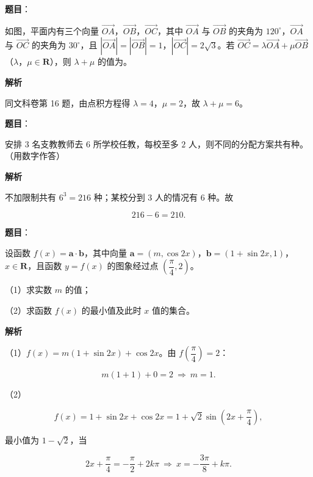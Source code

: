 \begin{answer}

\textbf{题目}：

如图，平面内有三个向量 $\overrightarrow{OA}$，$\overrightarrow{OB}$，$\overrightarrow{OC}$，其中 $\overrightarrow{OA}$ 与 $\overrightarrow{OB}$ 的夹角为 $120^\circ$，$\overrightarrow{OA}$ 与 $\overrightarrow{OC}$ 的夹角为 $30^\circ$，且 $|\overrightarrow{OA}|=|\overrightarrow{OB}|=1$，$|\overrightarrow{OC}|=2\sqrt3$。若 $\overrightarrow{OC}=\lambda\overrightarrow{OA}+\mu\overrightarrow{OB}$（$\lambda$，$\mu\in\mathbf R$），则 $\lambda+\mu$ 的值为\gkblank{}。
\nopagebreak[4]
\begin{center}\end{center}
\nopagebreak[4]
\textbf{解析}

同文科卷第 16 题，由点积方程得 $\lambda=4$，$\mu=2$，故 $\lambda+\mu=6$。


\end{answer}
\begin{answer}

\textbf{题目}：

安排 $3$ 名支教教师去 $6$ 所学校任教，每校至多 $2$ 人，则不同的分配方案共有\gkblank{}种。（用数字作答）

\textbf{解析}

不加限制共有 $6^3=216$ 种；某校分到 $3$ 人的情况有 $6$ 种。故

\nopagebreak[4]
\[216-6=210.\]


\end{answer}
\begin{answer}

\textbf{题目}：

设函数 $f(x)=\boldsymbol a\cdot\boldsymbol b$，其中向量 $\boldsymbol a=(m,\cos2x)$，$\boldsymbol b=(1+\sin2x,1)$，$x\in\mathbf R$，且函数 $y=f(x)$ 的图象经过点 $\left(\dfrac{\pi}{4},2\right)$。

（1）求实数 $m$ 的值；

（2）求函数 $f(x)$ 的最小值及此时 $x$ 值的集合。

\textbf{解析}

（1）$f(x)=m(1+\sin2x)+\cos2x$。由 $f\left(\dfrac{\pi}{4}\right)=2$：

\nopagebreak[4]
\[m(1+1)+0=2\ \Rightarrow\ m=1.\]

（2）

\nopagebreak[4]
\[f(x)=1+\sin2x+\cos2x=1+\sqrt2\sin\left(2x+\frac{\pi}{4}\right),\]

最小值为 $1-\sqrt2$，当

\nopagebreak[4]
\[2x+\frac{\pi}{4}=-\frac{\pi}{2}+2k\pi\ \Rightarrow\ x=-\frac{3\pi}{8}+k\pi.\]


\end{answer}
